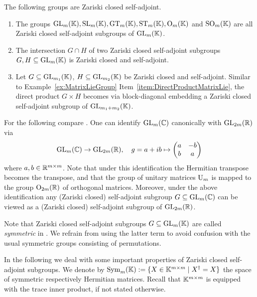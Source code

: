 \begin{example}\label{ex:ZClosedSelfAdjoint}
	The following groups are Zariski closed self-adjoint.
	\begin{enumerate}
		\item The groups $\operatorname{GL}_m(\mathbb K), \operatorname{SL}_m(\mathbb K), \operatorname{GT}_m(\mathbb K), \operatorname{ST}_m(\mathbb K), \operatorname{O}_m(\mathbb K)$ and $\operatorname{SO}_m(\mathbb K)$ are all Zariski closed self-adjoint subgroups of $\operatorname{GL}_m(\mathbb K)$.
		
		\item The intersection $G \cap H$ of two Zariski closed self-adjoint subgroups $G,H \subseteq \operatorname{GL}_m(\mathbb K)$ is Zariski closed and self-adjoint.
		
		\item \label{item:DirectProductZClosedSelfAdjoint}
		Let $G \subseteq \operatorname{GL}_{m_1}(\mathbb K)$, $H \subseteq \operatorname{GL}_{m_2}(\mathbb K)$ be Zariski closed and self-adjoint. Similar to Example~\ref{ex:MatrixLieGroup} Item~\ref{item:DirectProductMatrixLie}, the direct product $G \times H$ becomes via block-diagonal embedding a Zariski closed self-adjoint subgroup of $\operatorname{GL}_{m_1 + m_2}(\mathbb K)$.
		\hfill\exSymbol
	\end{enumerate}
\end{example}

\begin{remark}\label{rem:Wallach}
	For the following compare \cite[p.~39]{Wallach}.
	One can identify $\operatorname{GL}_m(\mathbb C)$ canonically with $\operatorname{GL}_{2m}(\mathbb R)$ via 
		\[ \operatorname{GL}_m(\mathbb C) \to \operatorname{GL}_{2m}(\mathbb R), \quad g = a + ib \mapsto \begin{pmatrix} a & -b \\ b & a \end{pmatrix} \]
	where $a, b \in \mathbb R^{m \times m}$. Note that under this identification the Hermitian transpose becomes the transpose, and that the group of unitary matrices $\operatorname{U}_m$ is mapped to the group $\operatorname{O}_{2m}(\mathbb R)$ of orthogonal matrices.
	Moreover, under the above identification any (Zariski closed) self-adjoint subgroup $G \subseteq \operatorname{GL}_m(\mathbb C)$ can be viewed as a (Zariski closed) self-adjoint subgroup of $\operatorname{GL}_{2m}(\mathbb R)$.
	
	Note that Zariski closed self-adjoint subgroups $G \subseteq \operatorname{GL}_m(\mathbb K)$ are called \emph{symmetric} in \cite{Wallach}. We refrain from using the latter term to avoid confusion with the usual symmetric groups consisting of permutations.
	\hfill\remSymbol
\end{remark} 

In the following we deal with some important properties of Zariski closed self-adjoint subgroups. We denote by $\operatorname{Sym}_m(\mathbb K) := \{ X \in \mathbb K^{m \times m} \mid X^{\dagger} = X\}$ the space of symmetric respectively Hermitian matrices.
Recall that $\mathbb K^{m \times m}$ is equipped with the trace inner product, if not stated otherwise.

